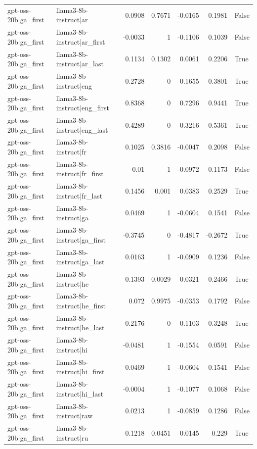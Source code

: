 \begin{table}
\begin{tabular}{l l r r r r l}
gpt-oss-20b|ga_first & llama3-8b-instruct|ar & 0.0908 & 0.7671 & -0.0165 & 0.1981 & False \\
gpt-oss-20b|ga_first & llama3-8b-instruct|ar_first & -0.0033 & 1 & -0.1106 & 0.1039 & False \\
gpt-oss-20b|ga_first & llama3-8b-instruct|ar_last & 0.1134 & 0.1302 & 0.0061 & 0.2206 & True \\
gpt-oss-20b|ga_first & llama3-8b-instruct|eng & 0.2728 & 0 & 0.1655 & 0.3801 & True \\
gpt-oss-20b|ga_first & llama3-8b-instruct|eng_first & 0.8368 & 0 & 0.7296 & 0.9441 & True \\
gpt-oss-20b|ga_first & llama3-8b-instruct|eng_last & 0.4289 & 0 & 0.3216 & 0.5361 & True \\
gpt-oss-20b|ga_first & llama3-8b-instruct|fr & 0.1025 & 0.3816 & -0.0047 & 0.2098 & False \\
gpt-oss-20b|ga_first & llama3-8b-instruct|fr_first & 0.01 & 1 & -0.0972 & 0.1173 & False \\
gpt-oss-20b|ga_first & llama3-8b-instruct|fr_last & 0.1456 & 0.001 & 0.0383 & 0.2529 & True \\
gpt-oss-20b|ga_first & llama3-8b-instruct|ga & 0.0469 & 1 & -0.0604 & 0.1541 & False \\
gpt-oss-20b|ga_first & llama3-8b-instruct|ga_first & -0.3745 & 0 & -0.4817 & -0.2672 & True \\
gpt-oss-20b|ga_first & llama3-8b-instruct|ga_last & 0.0163 & 1 & -0.0909 & 0.1236 & False \\
gpt-oss-20b|ga_first & llama3-8b-instruct|he & 0.1393 & 0.0029 & 0.0321 & 0.2466 & True \\
gpt-oss-20b|ga_first & llama3-8b-instruct|he_first & 0.072 & 0.9975 & -0.0353 & 0.1792 & False \\
gpt-oss-20b|ga_first & llama3-8b-instruct|he_last & 0.2176 & 0 & 0.1103 & 0.3248 & True \\
gpt-oss-20b|ga_first & llama3-8b-instruct|hi & -0.0481 & 1 & -0.1554 & 0.0591 & False \\
gpt-oss-20b|ga_first & llama3-8b-instruct|hi_first & 0.0469 & 1 & -0.0604 & 0.1541 & False \\
gpt-oss-20b|ga_first & llama3-8b-instruct|hi_last & -0.0004 & 1 & -0.1077 & 0.1068 & False \\
gpt-oss-20b|ga_first & llama3-8b-instruct|raw & 0.0213 & 1 & -0.0859 & 0.1286 & False \\
gpt-oss-20b|ga_first & llama3-8b-instruct|ru & 0.1218 & 0.0451 & 0.0145 & 0.229 & True \\

\end{tabular}
\end{table}
